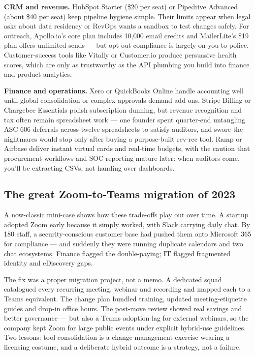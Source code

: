 \textbf{CRM and revenue.} HubSpot Starter (\$20 per seat) or Pipedrive Advanced (about \$40 per seat) keep pipeline hygiene simple. Their limits appear when legal asks about data residency or RevOps wants a sandbox to test changes safely. For outreach, Apollo.io's core plan includes 10,000 email credits and MailerLite's \$19 plan offers unlimited sends — but opt-out compliance is largely on you to police. Customer-success tools like Vitally or Customer.io produce persuasive health scores, which are only as trustworthy as the API plumbing you build into finance and product analytics.


\textbf{Finance and operations.} Xero or QuickBooks Online handle accounting well until global consolidation or complex approvals demand add-ons. Stripe Billing or Chargebee Essentials polish subscription dunning, but revenue recognition and tax often remain spreadsheet work — one founder spent quarter-end untangling ASC 606 deferrals across twelve spreadsheets to satisfy auditors, and swore the nightmares would stop only after buying a purpose-built rev-rec tool. Ramp or Airbase deliver instant virtual cards and real-time budgets, with the caution that procurement workflows and SOC reporting mature later: when auditors come, you'll be extracting CSVs, not handing over dashboards.



\subsection{The great Zoom-to-Teams migration of 2023}


A now-classic mini-case shows how these trade-offs play out over time. A startup adopted Zoom early because it simply worked, with Slack carrying daily chat. By 180 staff, a security-conscious customer base had pushed them onto Microsoft 365 for compliance — and suddenly they were running duplicate calendars and two chat ecosystems. Finance flagged the double-paying; IT flagged fragmented identity and eDiscovery gaps.


The fix was a proper migration project, not a memo. A dedicated squad catalogued every recurring meeting, webinar and recording and mapped each to a Teams equivalent. The change plan bundled training, updated meeting-etiquette guides and drop-in office hours. The post-move review showed real savings and better governance — but also a Teams adoption lag for external webinars, so the company kept Zoom for large public events under explicit hybrid-use guidelines. Two lessons: tool consolidation is a change-management exercise wearing a licensing costume, and a deliberate hybrid outcome is a strategy, not a failure.



